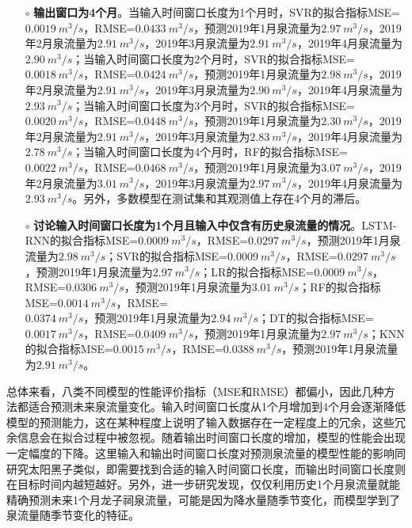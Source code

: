 \begin{enumerate}
\begin{itemize}
    \item[$\circ$] \textbf{输出窗口为4个月}。当输入时间窗口长度为1个月时，SVR的拟合指标MSE=\\$\SI{0.0019}{m^{3}/s}$，RMSE=$\SI{0.0433}{m^{3}/s}$，预测2019年1月泉流量为$\SI{2.97}{m^{3}/s}$，2019年2月泉流量为$\SI{2.91}{m^{3}/s}$，2019年3月泉流量为$\SI{2.91}{m^{3}/s}$，2019年4月泉流量为$\SI{2.90}{m^{3}/s}$；当输入时间窗口长度为2个月时，SVR的拟合指标MSE=$\SI{0.0018}{m^{3}/s}$，RMSE=$\SI{0.0424}{m^{3}/s}$，预测2019年1月泉流量为$\SI{2.98}{m^{3}/s}$，2019年2月泉流量为$\SI{2.91}{m^{3}/s}$，2019年3月泉流量为$\SI{2.90}{m^{3}/s}$，2019年4月泉流量为$\SI{2.93}{m^{3}/s}$；当输入时间窗口长度为3个月时，SVR的拟合指标MSE=$\SI{0.0020}{m^{3}/s}$，RMSE=$\SI{0.0448}{m^{3}/s}$，预测2019年1月泉流量为$\SI{2.30}{m^{3}/s}$，2019年2月泉流量为$\SI{2.91}{m^{3}/s}$，2019年3月泉流量为$\SI{2.83}{m^{3}/s}$，2019年4月泉流量为$\SI{2.78}{m^{3}/s}$；当输入时间窗口长度为4个月时，RF的拟合指标MSE=$\SI{0.0022}{m^{3}/s}$，RMSE=$\SI{0.0468}{m^{3}/s}$，预测2019年1月泉流量为$\SI{3.07}{m^{3}/s}$，2019年2月泉流量为$\SI{3.01}{m^{3}/s}$，2019年3月泉流量为$\SI{2.97}{m^{3}/s}$，2019年4月泉流量为$\SI{2.93}{m^{3}/s}$。另外，多数模型在测试集和其观测值上存在4个月的滞后。
    \item[$\circ$] \textbf{讨论输入时间窗口长度为1个月且输入中仅含有历史泉流量的情况}。LSTM-RNN的拟合指标MSE=$\SI{0.0009}{m^{3}/s}$，RMSE=$\SI{0.0297}{m^{3}/s}$，预测2019年1月泉流量为$\SI{2.98}{m^{3}/s}$；SVR的拟合指标MSE=$\SI{0.0009}{m^{3}/s}$，RMSE=$\SI{0.0297}{m^{3}/s}$，预测2019年1月泉流量为$\SI{2.97}{m^{3}/s}$；LR的拟合指标MSE=$\SI{0.0009}{m^{3}/s}$，RMSE=$\SI{0.0306}{m^{3}/s}$，预测2019年1月泉流量为$\SI{3.01}{m^{3}/s}$；RF的拟合指标MSE=$\SI{0.0014}{m^{3}/s}$，RMSE=\\$\SI{0.0374}{m^{3}/s}$，预测2019年1月泉流量为$\SI{2.94}{m^{3}/s}$；DT的拟合指标MSE=$\SI{0.0017}{m^{3}/s}$，RMSE=$\SI{0.0409}{m^{3}/s}$，预测2019年1月泉流量为$\SI{2.97}{m^{3}/s}$；KNN的拟合指标MSE=$\SI{0.0015}{m^{3}/s}$，RMSE=$\SI{0.0388}{m^{3}/s}$，预测2019年1月泉流量为$\SI{2.91}{m^{3}/s}$。 
  \end{itemize}
    
  总体来看，八类不同模型的性能评价指标（MSE和RMSE）都偏小，因此几种方法都适合预测未来泉流量变化。输入时间窗口长度从1个月增加到4个月会逐渐降低模型的预测能力，这在某种程度上说明了输入数据存在一定程度上的冗余，这些冗余信息会在拟合过程中被忽视。随着输出时间窗口长度的增加，模型的性能会出现一定幅度的下降。这里输入和输出时间窗口长度对预测泉流量的模型性能的影响同研究太阳黑子类似，即需要找到合适的输入时间窗口长度，而输出时间窗口长度则在目标时间内越短越好。另外，进一步研究发现，仅仅利用历史1个月泉流量就能精确预测未来1个月龙子祠泉流量，可能是因为降水量随季节变化，而模型学到了泉流量随季节变化的特征。


\end{enumerate}
